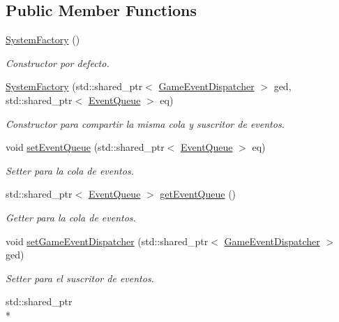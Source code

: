 \subsection*{Public Member Functions}
\begin{DoxyCompactItemize}
\item 
\hyperlink{classant_1_1_system_factory_a8a60ed77666e3e07495e45040fd0de96}{System\+Factory} ()
\begin{DoxyCompactList}\small\item\em Constructor por defecto. \end{DoxyCompactList}\item 
\hyperlink{classant_1_1_system_factory_a88f538f2817a297762047c95d4c8169a}{System\+Factory} (std\+::shared\+\_\+ptr$<$ \hyperlink{classant_1_1_game_event_dispatcher}{Game\+Event\+Dispatcher} $>$ ged, std\+::shared\+\_\+ptr$<$ \hyperlink{classant_1_1_event_queue}{Event\+Queue} $>$ eq)
\begin{DoxyCompactList}\small\item\em Constructor para compartir la misma cola y suscritor de eventos. \end{DoxyCompactList}\item 
void \hyperlink{classant_1_1_system_factory_a759cba610a22c58876d4edb528690ece}{set\+Event\+Queue} (std\+::shared\+\_\+ptr$<$ \hyperlink{classant_1_1_event_queue}{Event\+Queue} $>$ eq)
\begin{DoxyCompactList}\small\item\em Setter para la cola de eventos. \end{DoxyCompactList}\item 
std\+::shared\+\_\+ptr$<$ \hyperlink{classant_1_1_event_queue}{Event\+Queue} $>$ \hyperlink{classant_1_1_system_factory_ac7db589ce8fca629d7d871fa9ad4d663}{get\+Event\+Queue} ()
\begin{DoxyCompactList}\small\item\em Getter para la cola de eventos. \end{DoxyCompactList}\item 
void \hyperlink{classant_1_1_system_factory_ab4c382d78bd0214fb91e4e07ed3ee24d}{set\+Game\+Event\+Dispatcher} (std\+::shared\+\_\+ptr$<$ \hyperlink{classant_1_1_game_event_dispatcher}{Game\+Event\+Dispatcher} $>$ ged)
\begin{DoxyCompactList}\small\item\em Setter para el suscritor de eventos. \end{DoxyCompactList}\item 
std\+::shared\+\_\+ptr\\*

\end{DoxyCompactItemize}

